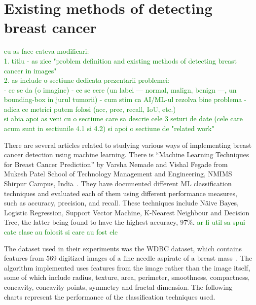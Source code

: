 \chapter{Existing methods of detecting breast cancer}
\label{chap:ch2}



\textcolor{green}{eu as face cateva modificari:\\
1. titlu - as zice "problem definition and existing methods of detecting breast cancer in images"\\
2. as include o sectiune dedicata prezentarii problemei:\\
- ce se da (o imagine) 
- ce se cere (un label --- normal, malign, benign ---, un bounding-box in jurul tumorii)
- cum stim ca AI/ML-ul rezolva bine problema - adica ce metrici putem folosi (acc, prec, recall, IoU, etc.)\\
si abia apoi as veni cu o sectiune care sa descrie cele 3 seturi de date (cele care acum sunt in sectiunile 4.1 si 4.2) si apoi o sectiune de "related work"}

\par There are several articles related to studying various ways of implementing breast cancer detection using machine learning. There is “Machine Learning Techniques for Breast Cancer Prediction” by Varsha Nemade and Vishal Fegade from Mukesh Patel School of Technology Management and Engineering, NMIMS Shirpur Campus, India~\cite{carte2}. They have documented different ML classification techniques and evaluated each of them using different performance measures, such as accuracy, precision, and recall. These techniques include N{\"a}ive Bayes, Logistic Regression, Support Vector Machine, K-Nearest Neighbour and Decision Tree, the latter being found to have the highest accuracy, 97\%. 
\textcolor{green}{ar fi util sa spui cate clase au folosit si care au fost ele}

The dataset used in their experiments was the WDBC dataset, which contains features from 569 digitized images of a fine needle aspirate of a breast mass~\cite{link3}. The algorithm implemented uses features from the image rather than the image itself, some of which include radius, texture, area, perimeter, smoothness, compactness, concavity, concavity points, symmetry and fractal dimension. The following charts represent the performance of the classification techniques used.

